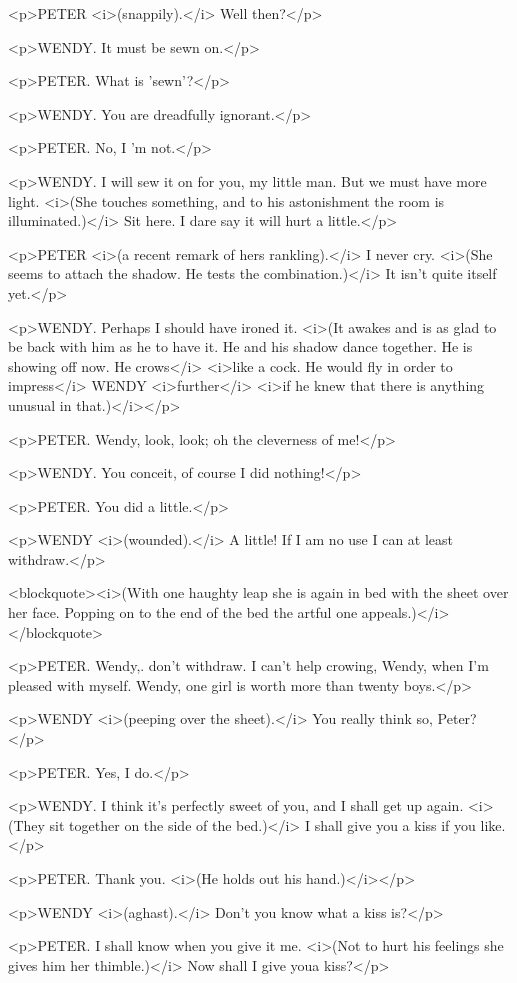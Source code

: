 <p>PETER <i>(snappily).</i> Well then?</p>

<p>WENDY. It must be sewn on.</p>

<p>PETER. What is 'sewn'?</p>

<p>WENDY. You are dreadfully ignorant.</p>

<p>PETER. No, I 'm not.</p>

<p>WENDY. I will sew it on for you, my little man. But we must have
more light. <i>(She touches something, and to his astonishment the
room is illuminated.)</i> Sit here. I dare say it will hurt a
little.</p>

<p>PETER <i>(a recent remark of hers rankling).</i> I never cry.
<i>(She seems to attach the shadow. He tests the combination.)</i> It
isn't quite itself yet.</p>

<p>WENDY. Perhaps I should have ironed it. <i>(It awakes and is as
glad to be back with him as he to have it. He and his shadow dance
together. He is showing off now. He crows</i> <i>like a cock. He
would fly in order to impress</i> WENDY <i>further</i> <i>if he knew
that there is anything unusual in that.)</i></p>

<p>PETER. Wendy, look, look; oh the cleverness of me!</p>

<p>WENDY. You conceit, of course I did nothing!</p>

<p>PETER. You did a little.</p>

<p>WENDY <i>(wounded).</i> A little! If I am no use I can at least
withdraw.</p>

<blockquote><i>(With one haughty leap she is again in bed with the
sheet over her face. Popping on to the end of the bed the artful one
appeals.)</i></blockquote>

<p>PETER. Wendy,. don't withdraw. I can't help crowing, Wendy, when
I'm pleased with myself. Wendy, one girl is worth more than twenty
boys.</p>

<p>WENDY <i>(peeping over the sheet).</i> You really think so,
Peter?</p>

<p>PETER. Yes, I do.</p>

<p>WENDY. I think it's perfectly sweet of you, and I shall get up
again. <i>(They sit together on the side of the bed.)</i> I shall
give you a kiss if you like.</p>

<p>PETER. Thank you. <i>(He holds out his hand.)</i></p>

<p>WENDY <i>(aghast).</i> Don't you know what a kiss is?</p>

<p>PETER. I shall know when you give it me. <i>(Not to hurt his
feelings she gives him her thimble.)</i> Now shall I give youa
kiss?</p>

